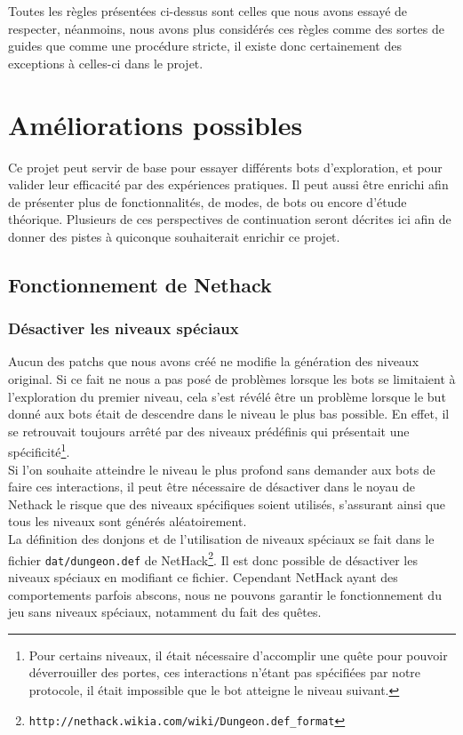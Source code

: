 \documentclass[a4paper,12pt]{article}
\begin{document}
Toutes les règles présentées ci-dessus sont celles que nous avons essayé de
respecter, néanmoins, nous avons plus considérés ces règles comme des sortes de
guides que comme une procédure stricte, il existe donc certainement des
exceptions à celles-ci dans le projet.

\section{Améliorations possibles}
Ce projet peut servir de base pour essayer différents bots d'exploration,
et pour valider leur efficacité par des expériences pratiques. Il peut aussi
être enrichi afin de présenter plus de fonctionnalités, de modes, de bots ou
encore d'étude théorique. Plusieurs de ces perspectives de continuation seront
décrites ici afin de donner des pistes à quiconque souhaiterait enrichir ce
projet.

\subsection{Fonctionnement de Nethack}
\subsubsection{Désactiver les niveaux spéciaux}
Aucun des patchs que nous avons créé ne modifie la génération des niveaux
original. Si ce fait ne nous a pas posé de problèmes lorsque les bots se
limitaient à l'exploration du premier niveau, cela s'est révélé être un problème
lorsque le but donné aux bots était de descendre dans le niveau le plus bas
possible. En effet, il se retrouvait toujours arrêté par des niveaux prédéfinis
qui présentait une spécificité\footnote{Pour certains niveaux, il était
nécessaire d'accomplir une quête pour pouvoir déverrouiller des portes, ces
interactions n'étant pas spécifiées par notre protocole, il était impossible que
le bot atteigne le niveau suivant.}.
\\
Si l'on souhaite atteindre le niveau le plus profond sans demander aux bots de
faire ces interactions, il peut être nécessaire de désactiver dans le noyau de
Nethack le risque que des niveaux spécifiques soient utilisés, s'assurant ainsi
que tous les niveaux sont générés aléatoirement.
\\
La définition des donjons et de l'utilisation de niveaux spéciaux se fait dans
le fichier \verb!dat/dungeon.def! de
NetHack\footnote{\verb!http://nethack.wikia.com/wiki/Dungeon.def_format!}. Il
est donc possible de désactiver les niveaux spéciaux en modifiant ce fichier.
Cependant NetHack ayant des comportements parfois abscons, nous ne pouvons
garantir le fonctionnement du jeu sans niveaux spéciaux, notamment du fait des
quêtes.
\end{document}
